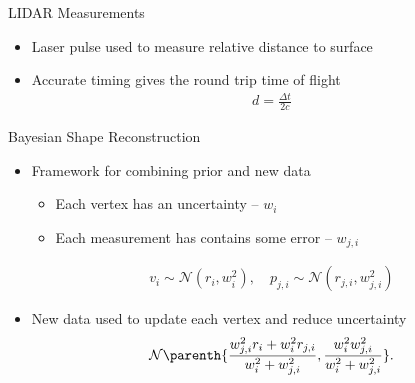 \documentclass[11pt,professionalfonts,aspectratio=169]{beamer}
\begin{document}
\begin{frame}{LIDAR Measurements }
    \begin{itemize}
        \item<1-> Laser pulse used to measure relative distance to surface
        \item<2-> Accurate timing gives the round trip time of flight
            \begin{align*}
                d = \frac{\Delta t}{2 c}
            \end{align*}
    \end{itemize}
    
\end{frame}

\begin{frame}{Bayesian Shape Reconstruction}
    \begin{itemize}
        \item<1-> Framework for combining prior and new data 
            \begin{itemize}
                \item Each vertex has an uncertainty -- \( w_i\)
                \item Each measurement has contains some error -- \( w_{j, i} \)
            \end{itemize}
            \begin{align*}
                v_i \sim \mathcal{N}(r_i, w_i^2) , \quad
                p_{j,i} \sim \mathcal{N}(r_{j,i}, w_{j,i}^2)
            \end{align*}
        \item<2-> New data used to update each vertex and reduce uncertainty
    \begin{align*}\label{eq:posterior_probability}
        \mathcal{N} \parenth{\frac{w_{j, i}^2 r_i + w_i^2 r_{j, i}}{w_i^2 + w_{j, i}^2} , \frac{w_i^2  w_{j, i}^2}{w_i^2 +  w_{j, i}^2}} .
    \end{align*}
    \end{itemize}
\end{frame}
\end{document}
